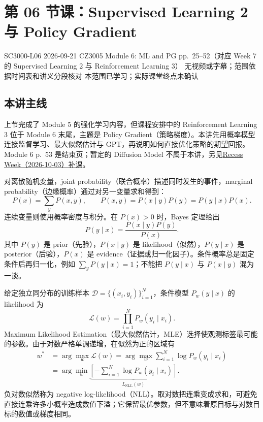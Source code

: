 \section{第 06 节课：Supervised Learning 2 与 Policy Gradient}
\label{lecture:SC3000-L06}

\lecturemeta
  {SC3000-L06}
  {2026-09-21}
  {CZ3005 Module 6: ML and PG}
  {pp.~25--52（对应 Week 7 的 Supervised Learning 2 与 Reinforcement Learning 3）}
  {无视频或字幕；范围依据时间表和讲义分段核对}
  {本范围已学习；实际课堂终点未确认}

\subsection{本讲主线}

上节完成了 Module 5 的强化学习内容，但课程安排中的 Reinforcement Learning 3 位于 Module 6 末尾，主题是 Policy Gradient（策略梯度）。本讲先用概率模型连接监督学习、最大似然估计与 GPT，再说明如何直接优化策略的期望回报。Module 6 p.~53 是结束页；暂定的 Diffusion Model 不属于本讲，另见\hyperref[lecture:SC3000-SUP01]{Recess Week（2026-10-03）补课}。


对离散随机变量，joint probability（联合概率）描述同时发生的事件，marginal probability（边缘概率）通过对另一变量求和得到：
\[
  P(x)=\sum_yP(x,y),\qquad
  P(x,y)=P(x\mid y)P(y)=P(y\mid x)P(x).
\]
连续变量则使用概率密度与积分。在 $P(x)>0$ 时，Bayes 定理给出
\[
  \boxed{P(y\mid x)=\frac{P(x\mid y)P(y)}{P(x)}}.
\]
其中 $P(y)$ 是 prior（先验），$P(x\mid y)$ 是 likelihood（似然），$P(y\mid x)$ 是 posterior（后验），$P(x)$ 是 evidence（证据或归一化因子）。条件概率总是固定条件后再归一化，例如 $\sum_yP(y\mid x)=1$；不能把 $P(y\mid x)$ 与 $P(x\mid y)$ 混为一谈。


给定独立同分布的训练样本 $\mathcal D=\{(x_i,y_i)\}_{i=1}^{N}$，条件模型 $P_w(y\mid x)$ 的 likelihood 为
\[
  \mathcal L(w)=\prod_{i=1}^{N}P_w(y_i\mid x_i).
\]
Maximum Likelihood Estimation（最大似然估计，MLE）选择使观测标签最可能的参数。由于对数严格单调递增，在似然为正的区域有
\begin{align*}
  w^*
  &=\arg\max_w\mathcal L(w)
   =\arg\max_w\sum_{i=1}^{N}\log P_w(y_i\mid x_i)\\
  &=\arg\min_w\underbrace{\left[-\sum_{i=1}^{N}\log P_w(y_i\mid x_i)\right]}_{L_{\mathrm{NLL}}(w)}.
\end{align*}
负对数似然称为 negative log-likelihood（NLL）。取对数把连乘变成求和，可避免直接连乘许多小概率造成数值下溢；它保留最优参数，但不意味着原目标与对数目标的数值或梯度相同。

